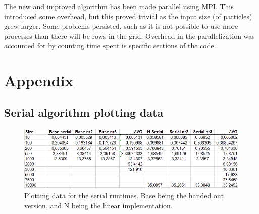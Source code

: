 \documentclass[a4paper,11pt,oneside]{book}
\begin{document}
The new and improved algorithm has been made parallel using MPI. This introduced some overhead, but this proved trivial as the input size (of particles) grew larger. Some problems persisted, such as it is not possible to use more processes than there will be rows in the grid. Overhead in the parallelization was accounted for by counting time spent is specific sections of the code. 

\newpage
{}
\chapter{Appendix}
\section{Serial algorithm plotting data}

\begin{figure}[H]
  \centering
  \begin{minipage}[b]{0.9\textwidth}
    \includegraphics[width=\textwidth]{plotdata.png}
    \caption{Plotting data for the serial runtimes. Base being the handed out version, and N being the linear implementation.}
  \end{minipage}
\end{figure}
\end{document}
